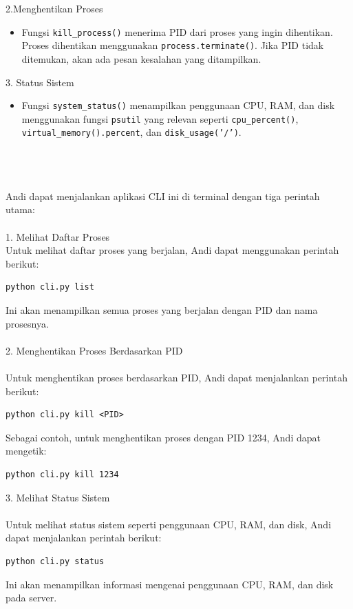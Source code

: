 \documentclass[12pt]{article}
\begin{document}
2.Menghentikan Proses
\begin{itemize}
    \item Fungsi \texttt{kill\_process()} menerima PID dari proses yang ingin dihentikan. Proses dihentikan menggunakan \texttt{process.terminate()}. Jika PID tidak ditemukan, akan ada pesan kesalahan yang ditampilkan.
\end{itemize}

3. Status Sistem
\begin{itemize}
    \item Fungsi \texttt{system\_status()} menampilkan penggunaan CPU, RAM, dan disk menggunakan fungsi \texttt{psutil} yang relevan seperti \texttt{cpu\_percent()}, \texttt{virtual\_memory().percent}, dan \texttt{disk\_usage('/')}.\\\\\\\\
\end{itemize}
Andi dapat menjalankan aplikasi CLI ini di terminal dengan tiga perintah utama:\\
\\
1. Melihat Daftar Proses
\\
Untuk melihat daftar proses yang berjalan, Andi dapat menggunakan perintah berikut:\\

\begin{verbatim}
python cli.py list
\end{verbatim}
Ini akan menampilkan semua proses yang berjalan dengan PID dan nama prosesnya.\\
\\
2. Menghentikan Proses Berdasarkan PID\\
\\
Untuk menghentikan proses berdasarkan PID, Andi dapat menjalankan perintah berikut:
\\
\begin{verbatim}
python cli.py kill <PID>
\end{verbatim}
Sebagai contoh, untuk menghentikan proses dengan PID 1234, Andi dapat mengetik:\\
\begin{verbatim}
python cli.py kill 1234
\end{verbatim}
3. Melihat Status Sistem\\
\\
Untuk melihat status sistem seperti penggunaan CPU, RAM, dan disk, Andi dapat menjalankan perintah berikut:
\\
\begin{verbatim}
python cli.py status
\end{verbatim}
Ini akan menampilkan informasi mengenai penggunaan CPU, RAM, dan disk pada server.
\\
\end{document}
